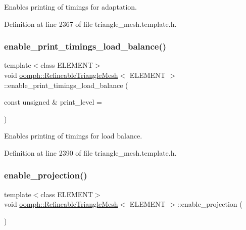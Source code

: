 Enables printing of timings for adaptation. 



Definition at line 2367 of file triangle\+\_\+mesh.\+template.\+h.

\mbox{\label{classoomph_1_1RefineableTriangleMesh_a262467b16b4d2749230e9ace5649b8cf}} 
\subsubsection{\texorpdfstring{enable\+\_\+print\+\_\+timings\+\_\+load\+\_\+balance()}{enable\_print\_timings\_load\_balance()}}
{\footnotesize\ttfamily template$<$class E\+L\+E\+M\+E\+NT$>$ \\
void \hyperlink{classoomph_1_1RefineableTriangleMesh}{oomph\+::\+Refineable\+Triangle\+Mesh}$<$ E\+L\+E\+M\+E\+NT $>$\+::enable\+\_\+print\+\_\+timings\+\_\+load\+\_\+balance (\begin{DoxyParamCaption}\item[{const unsigned \&}]{print\+\_\+level = {} }\end{DoxyParamCaption})\hspace{0.3cm}{\ttfamily [inline]}}



Enables printing of timings for load balance. 



Definition at line 2390 of file triangle\+\_\+mesh.\+template.\+h.

\mbox{\label{classoomph_1_1RefineableTriangleMesh_a9cbf49d194c39396c7a6765b1c4520fc}} 
\subsubsection{\texorpdfstring{enable\+\_\+projection()}{enable\_projection()}}
{\footnotesize\ttfamily template$<$class E\+L\+E\+M\+E\+NT$>$ \\
void \hyperlink{classoomph_1_1RefineableTriangleMesh}{oomph\+::\+Refineable\+Triangle\+Mesh}$<$ E\+L\+E\+M\+E\+NT $>$\+::enable\+\_\+projection (\begin{DoxyParamCaption}{ }\end{DoxyParamCaption})\hspace{0.3cm}{\ttfamily [inline]}}



